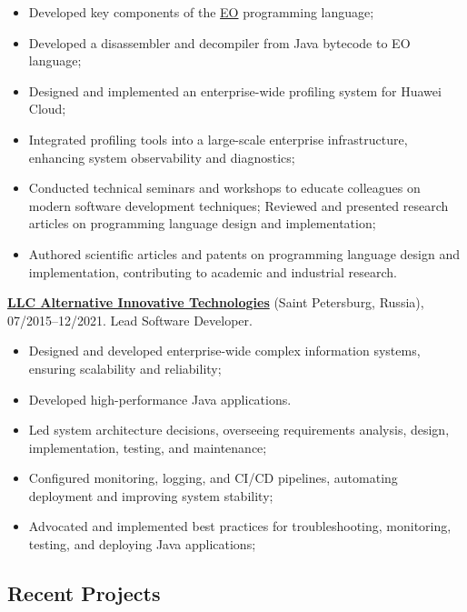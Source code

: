 \documentclass{vl}
\begin{document}
    \begin{itemize}
        \itemsep0em
        \item Developed key components of the \href{https://github.com/objectionary/eo}{EO} programming language;
        \item Developed a disassembler and decompiler from Java bytecode to EO language;
        \item Designed and implemented an enterprise-wide profiling system for Huawei Cloud;
        \item Integrated profiling tools into a large-scale enterprise infrastructure, enhancing system
        observability and diagnostics;
        \item Conducted technical seminars and workshops to educate colleagues on modern software development techniques;
        Reviewed and presented research articles on programming language design and implementation;
        \item Authored scientific articles and patents on programming language design and implementation,
        contributing to academic and industrial research.
    \end{itemize}

    \textbf{\href{https://altinntech.com/en/}{LLC Alternative Innovative Technologies}} (Saint Petersburg, Russia),
    07/2015--12/2021.
    Lead Software Developer.

    \begin{itemize}
        \itemsep0em
        \item Designed and developed enterprise-wide complex information systems, ensuring scalability and reliability;
        \item Developed high-performance Java applications.
        \item Led system architecture decisions, overseeing requirements analysis, design, implementation, testing,
        and maintenance;
        \item Configured monitoring, logging, and CI/CD pipelines, automating deployment and improving system stability;
        \item Advocated and implemented best practices for troubleshooting, monitoring, testing, and deploying
        Java applications;
    \end{itemize}

    \subsection*{Recent Projects}
\end{document}
